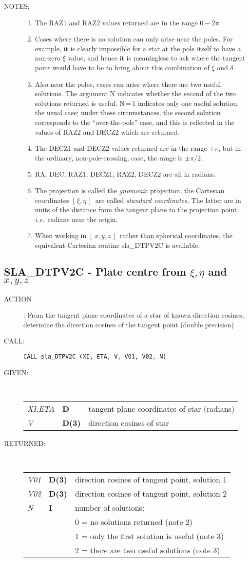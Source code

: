 \documentclass[11pt,twoside]{article}
\newcommand{\xlabel}[1]{}
\newcommand{\xieta}     {$[\,\xi,\eta\,]$}
\newcommand{\xyz}       {$[\,x,y,z\,]$}
\newcommand{\routine}[3]
{\hbadness=10000
  \vbox
  {
    \rule{\textwidth}{0.3mm}\\
    {\Large {\bf #1} \hfill #2 \hfill {\bf #1}}\\
    \setlength{\oldspacing}{\topsep}
    \setlength{\topsep}{0.3ex}
    \begin{description}
      #3
    \end{description}
    \setlength{\topsep}{\oldspacing}
  }
}
\renewcommand{\routine}[3]
   {
      \subsection{#1\xlabel{#1} - #2\label{#1}}
       \begin{description}
         #3
       \end{description}
   }
\newcommand{\action}[1]
{\item[ACTION]: #1}
\newcommand{\action}[1]
   {\item[ACTION:] #1}
\newcommand{\call}[1]
{\item[CALL]: \hspace{0.4em}{\tt #1}}
\newlength{\oldspacing}
\renewcommand{\call}[1]
   {
    \item[CALL:] {\tt #1}
   }
\newcommand{\args}[2]
{
  \goodbreak
  \setlength{\oldspacing}{\topsep}
  \setlength{\topsep}{0.3ex}
  \begin{description}
  \item[#1]:\\[1.5ex]
    \begin{tabular}{p{7em}p{6em}p{22em}}
      #2
    \end{tabular}
  \end{description}
  \setlength{\topsep}{\oldspacing}
}
\renewcommand{\args}[2]
   {
     \begin{description}
        \item[#1:]\\
        \begin{tabular}{p{7em}p{6em}l}
           #2
        \end{tabular}
     \end{description}
   }
\newcommand{\spec}[3]
{
  {\em {#1}} & {\bf \mbox{#2}} & {#3}
}
\newcommand{\notes}[1]
{
  \goodbreak
  \setlength{\oldspacing}{\topsep}
  \setlength{\topsep}{0.3ex}
  \begin{description}
    \item[NOTES]:
        #1
  \end{description}
  \setlength{\topsep}{\oldspacing}
}
\renewcommand{\notes}[1]
   {
      \begin{description}
         \item[NOTES:]
            #1
      \end{description}
   }
\begin{document}
\notes
{
 \begin{enumerate}
  \item The RAZ1 and RAZ2 values returned are in the range $0\!-\!2\pi$.
  \item Cases where there is no solution can only arise near the poles.
        For example, it is clearly impossible for a star at the pole
        itself to have a non-zero $\xi$ value, and hence it is
        meaningless to ask where the tangent point would have to be
        to bring about this combination of $\xi$ and $\delta$.
  \item Also near the poles, cases can arise where there are two useful
        solutions.  The argument N indicates whether the second of the
        two solutions returned is useful.  N\,=\,1
        indicates only one useful solution, the usual case;  under
        these circumstances, the second solution corresponds to the
        ``over-the-pole'' case, and this is reflected in the values
        of RAZ2 and DECZ2 which are returned.
  \item The DECZ1 and DECZ2 values returned are in the range $\pm\pi$,
        but in the ordinary, non-pole-crossing, case, the range is
        $\pm\pi/2$.
  \item RA, DEC, RAZ1, DECZ1, RAZ2, DECZ2 are all in radians.
  \item The projection is called the {\it gnomonic}\/ projection;  the
        Cartesian coordinates \xieta\ are called
        {\it standard coordinates.}\/  The latter
        are in units of the distance from the tangent plane to the projection
        point, {\it i.e.}\ radians near the origin.
  \item When working in \xyz\ rather than spherical coordinates, the
        equivalent Cartesian routine sla\_DTPV2C is available.
 \end{enumerate}
}
\routine{SLA\_DTPV2C}{Plate centre from $\xi,\eta$ and $x,y,z$}
{
 \action{From the tangent plane coordinates of a star of known
         direction cosines, determine the direction cosines
         of the tangent point (double precision)}
 \call{CALL sla\_DTPV2C (XI, ETA, V, V01, V02, N)}
}
\args{GIVEN}
{
 \spec{XI,ETA}{D}{tangent plane coordinates of star (radians)} \\
 \spec{V}{D(3)}{direction cosines of star}
}
\args{RETURNED}
{
 \spec{V01}{D(3)}{direction cosines of tangent point, solution 1} \\
 \spec{V02}{D(3)}{direction cosines of tangent point, solution 2} \\
 \spec{N}{I}{number of solutions:} \\
 \spec{}{}{\hspace{1em} 0 = no solutions returned  (note 2)} \\
 \spec{}{}{\hspace{1em} 1 = only the first solution is useful (note 3)} \\
 \spec{}{}{\hspace{1em} 2 = there are two useful solutions (note 3)}
}
\end{document}
